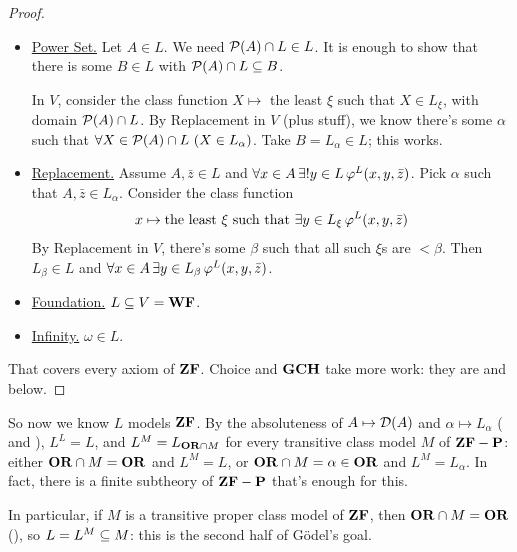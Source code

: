 \begin{proof}
\begin{itemize}
        \item \underline{Power Set.} Let $A \in L$. We need $\mathcal{P}(A) \cap L \in L$. It is enough to show that there is some $B \in L$ with $\mathcal{P}(A) \cap L \subseteq B$.

        In $V$, consider the class function $X \mapsto$ the least $\xi$ such that $X \in L_{\xi}$, with domain $\mathcal{P}(A) \cap L$. By Replacement in $V$ (plus stuff), we know there's some $\alpha$ such that $\forall X \in \mathcal{P}(A) \cap L \, \left( X \in L_{\alpha} \right)$. Take $B = L_{\alpha} \in L$; this works.

        \item \underline{Replacement.} Assume $A, \bar{z} \in L$ and $\forall x \in A \, \exists! y \in L \, \varphi^L\!\left( x, y, \bar{z} \right)$. Pick $\alpha$ such that $A, \bar{z} \in L_{\alpha}$. Consider the class function
        \begin{align*}
            x \mapsto \text{the least $\xi$ such that } \exists y \in L_{\xi} \, \varphi^L\!\left( x, y, \bar{z} \right)
        \end{align*}
        By Replacement in $V$, there's some $\beta$ such that all such $\xi$s are $< \beta$. Then $L_{\beta} \in L$ and $\forall x \in A \, \exists y \in L_{\beta} \, \varphi^L\!\left( x, y, \bar{z} \right)$.

        \item \underline{Foundation.} $L \subseteq V = \mathbf{WF}$.

        \item \underline{Infinity.} $\omega \in L$.
    \end{itemize}
    That covers every axiom of $\mathbf{ZF}$. Choice and $\mathbf{GCH}$ take more work: they are  and  below.
\end{proof}


So now we know $L$ models $\mathbf{ZF}$. By the absoluteness of $A \mapsto \mathcal{D}(A)$ and $\alpha \mapsto L_{\alpha}$ ( and ), $L^L = L$, and $L^M = L_{\mathbf{OR} \cap M}$ for every transitive class model $M$ of $\mathbf{ZF} - \mathbf{P}$: either $\mathbf{OR} \cap M = \mathbf{OR}$ and $L^M = L$, or $\mathbf{OR} \cap M = \alpha \in \mathbf{OR}$ and $L^M = L_{\alpha}$. In fact, there is a finite subtheory of $\mathbf{ZF} - \mathbf{P}$ that's enough for this.

In particular, if $M$ is a transitive proper class model of $\mathbf{ZF}$, then $\mathbf{OR} \cap M = \mathbf{OR}$ (), so $L = L^M \subseteq M$: this is the second half of Gödel's goal.
